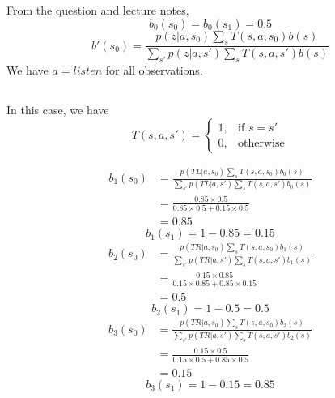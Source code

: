 From the question and lecture notes,
\[b_0(s_0)=b_0(s_1)=0.5\]
\[b'(s_0)
=\frac{p(z|a,s_0)\sum_s T(s,a,s_0)b(s)}
{\sum_{s'}p(z|a,s')\sum_s T(s,a,s')b(s)}\]
We have $a=listen$ for all observations.

\subsection{}
In this case, we have
\begin{equation}
    T(s,a,s')=
    \begin{cases}
        1, & \text{if } s=s'\\
        0, & \text{otherwise}
    \end{cases}
\end{equation}

\begin{equation}
\begin{aligned}
    b_1(s_0)
    &=\frac{p(TL|a,s_0)\sum_s T(s,a,s_0)b_0(s)}
    {\sum_{s'}p(TL|a,s')\sum_s T(s,a,s')b_0(s)}\\
    &=\frac{0.85\times 0.5}{0.85\times 0.5 + 0.15\times 0.5}\\
    &=0.85
\end{aligned}
\end{equation}
\begin{equation}
    b_1(s_1)=1-0.85=0.15
\end{equation}
\begin{equation}
\begin{aligned}
    b_2(s_0)
    &=\frac{p(TR|a,s_0)\sum_s T(s,a,s_0)b_1(s)}
    {\sum_{s'}p(TR|a,s')\sum_s T(s,a,s')b_1(s)}\\
    &=\frac{0.15\times 0.85}{0.15\times 0.85 + 0.85\times 0.15}\\
    &=0.5
\end{aligned}
\end{equation}
\begin{equation}
    b_2(s_1)=1-0.5=0.5
\end{equation}
\begin{equation}
\begin{aligned}
    b_3(s_0)
    &=\frac{p(TR|a,s_0)\sum_s T(s,a,s_0)b_2(s)}
    {\sum_{s'}p(TR|a,s')\sum_s T(s,a,s')b_2(s)}\\
    &=\frac{0.15\times 0.5}{0.15\times 0.5 + 0.85\times 0.5}\\
    &=0.15
\end{aligned}
\end{equation}
\begin{equation}
    b_3(s_1)=1-0.15=0.85
\end{equation}

